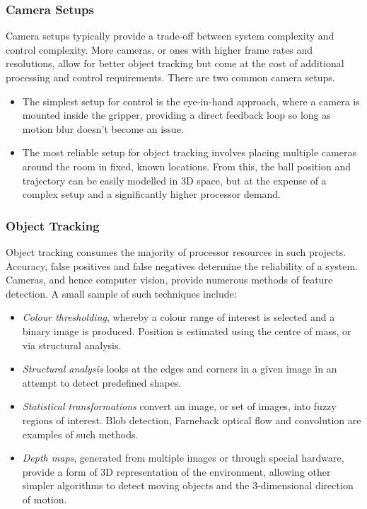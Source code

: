 \documentclass[conference]{IEEEtran}
\begin{document}
\subsubsection{Camera Setups}
Camera setups typically provide a trade-off between system complexity and control complexity. More cameras, or ones with higher frame rates and resolutions, allow for better object tracking but come at the cost of additional processing and control requirements.
There are two common camera setups.
\begin{itemize}
	\item The simplest setup for control is the eye-in-hand approach, where a camera is mounted inside the gripper, providing a direct feedback loop so long as motion blur doesn’t become an issue.
	\item The most reliable setup for object tracking involves placing multiple cameras around the room in fixed, known locations. From this, the ball position and trajectory can be easily modelled in 3D space, but at the expense of a complex setup and a significantly higher processor demand.

\end{itemize}
\subsubsection{Object Tracking}
Object tracking consumes the majority of processor resources in such projects. Accuracy, false positives and false negatives determine the reliability of a system. Cameras, and hence computer vision, provide numerous methods of feature detection. A small sample of such techniques include:
\begin{itemize}
	\item \textit{Colour thresholding}, whereby a colour range of interest is selected and a binary image is produced. Position is estimated using the centre of mass, or via structural analysis.
	\item \textit{Structural analysis} looks at the edges and corners in a given image in an attempt to detect predefined shapes.
	\item \textit{Statistical transformations} convert an image, or set of images, into fuzzy regions of interest. Blob detection, Farneback optical flow and convolution are examples of such methods.
	\item \textit{Depth maps}, generated from multiple images or through special hardware, provide a form of 3D representation of the environment, allowing other simpler algorithms to detect moving objects and the 3-dimensional direction of motion.
\end{itemize}
\end{document}
